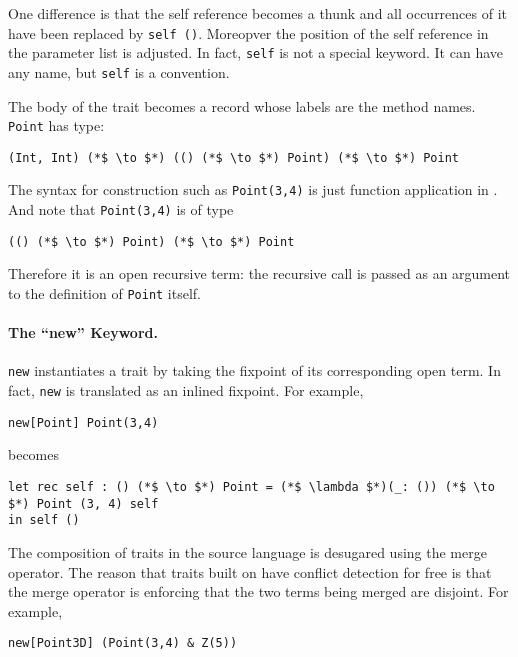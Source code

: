 One difference is that the self reference becomes a thunk and all occurrences of
it have been replaced by \lstinline$self ()$. Moreopver the position of the self
reference in the parameter list is adjusted. In fact, \lstinline$self$ is not a
special keyword. It can have any name, but \lstinline$self$ is a
convention.

The body of the trait becomes a record whose labels are the method names.
\lstinline$Point$ has type:

\begin{lstlisting}
(Int, Int) (*$ \to $*) (() (*$ \to $*) Point) (*$ \to $*) Point
\end{lstlisting}

The syntax for construction such as \lstinline$Point(3,4)$ is just function
application in \name. And note that \lstinline$Point(3,4)$ is of type
\begin{lstlisting}
(() (*$ \to $*) Point) (*$ \to $*) Point
\end{lstlisting}

Therefore it is an open recursive term: the recursive call is passed
as an argument to the definition of \lstinline$Point$ itself.

\paragraph{The ``new'' Keyword.} \lstinline$new$ instantiates a trait by taking the
fixpoint of its corresponding open term. In fact, \lstinline$new$ is translated as
an inlined fixpoint. For example,

\begin{lstlisting}
new[Point] Point(3,4)
\end{lstlisting}

\noindent becomes

\begin{lstlisting}
let rec self : () (*$ \to $*) Point = (*$ \lambda $*)(_: ()) (*$ \to $*) Point (3, 4) self
in self ()
\end{lstlisting}

The composition of traits in the source language is desugared using the merge
operator. The reason that traits built on \name have conflict detection for free
is that the merge operator is enforcing that the two terms being merged are
disjoint. For example,

\begin{lstlisting}
new[Point3D] (Point(3,4) & Z(5))
\end{lstlisting}

